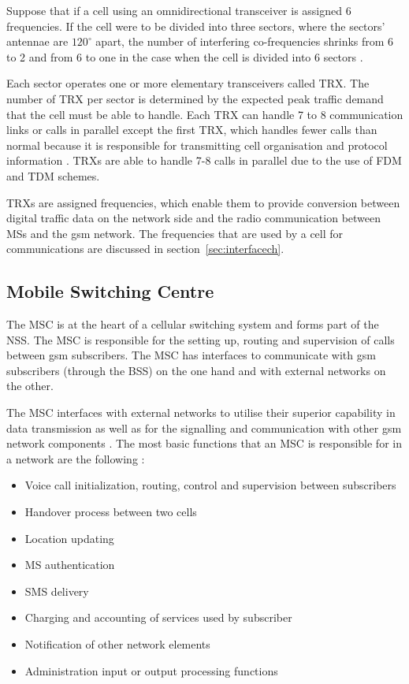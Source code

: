 Suppose that if a cell using an omnidirectional transceiver is assigned 6 frequencies. If the cell were to be divided into three sectors, where the sectors' antennae are $120^\circ$ apart, the number of interfering co-frequencies shrinks from 6 to 2 and from 6 to one in the case when the cell is divided into 6 sectors \cite{GSMSysEngin,GSM92,GSMArchitectureProtocolsServices}.

Each sector operates one or more elementary transceivers called \gls{TRX}. The number of \gls{TRX} per sector is determined by the expected peak traffic demand that the cell must be able to handle. Each \gls{TRX} can handle 7 to 8 communication links or calls in parallel except the first \gls{TRX}, which handles fewer calls than normal because it is responsible for transmitting cell organisation and protocol information \cite{Eisenblatter}. \glspl{TRX} are able to handle 7-8 calls in parallel due to the use of \gls{FDM} and \gls{TDM} schemes. 

\glspl{TRX} are assigned frequencies, which enable them to provide conversion between digital traffic data on the network side and the radio communication between \glspl{MS} and the \gls{gsm} network\cite{ACOvsEA,FAPOrientationModel}. The frequencies that are used by a cell for communications are discussed in section~\ref{sec:interfacech}.

\subsection{Mobile Switching Centre}

The \gls{MSC} is at the heart of a cellular switching system and forms part of the \gls{NSS}. The \gls{MSC} is responsible for the setting up, routing and supervision of calls between \gls{gsm} subscribers\cite{GSM92,GSMSysEngin}. The \gls{MSC} has interfaces to communicate with \gls{gsm} subscribers (through the \gls{BSS}) on the one hand and with external networks on the other\cite{GSM92}. 

The \gls{MSC} interfaces with external networks to utilise their superior capability in data transmission as well as for the signalling and communication with other \gls{gsm} network components \cite{GSM92}. 
The most basic functions that an \gls{MSC} is responsible for in a network are the following \cite{wirelesstelcoMullet}:
\begin{itemize}
\item Voice call initialization, routing, control and supervision between subscribers
\item Handover process between two cells
\item Location updating
\item \gls{MS} authentication
\item \gls{SMS} delivery
\item Charging and accounting of services used by subscriber
\item Notification of other network elements
\item Administration input or output processing functions
\end{itemize}

